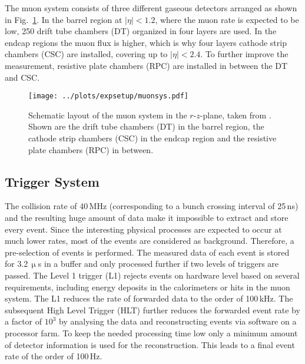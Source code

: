 \noindent The muon system consists of three different gaseous detectors arranged as shown in Fig.~\ref{fig:expsetup:muonsys}. In the barrel region at $|\eta|<1.2$, where the muon rate is expected to be low, 250 drift tube chambers (DT) organized in four layers are used. In the endcap regions the muon flux is higher, which is why four layers cathode strip chambers (CSC) are installed, covering up to $|\eta|<2.4$. To further improve the measurement, resistive plate chambers (RPC) are installed in between the DT and CSC.
\begin{figure}
    \centering
    \texttt{[image: ../plots/expsetup/muonsys.pdf]}
    \caption[Schematic layout of the muon system in the $r$-$z$-plane]{Schematic layout of the muon system in the $r$-$z$-plane, taken from \cite{CMS_design}. Shown are the drift tube chambers (DT) in the barrel region, the cathode strip chambers (CSC) in the endcap region and the resistive plate chambers (RPC) in between.}
    \label{fig:expsetup:muonsys}
\end{figure}
\subsection*{Trigger System}
The collision rate of 40\,MHz (corresponding to a bunch crossing interval of 25\,ns) and the resulting huge amount of data make it impossible to extract and store every event. Since the interesting physical processes are expected to occur at much lower rates, most of the events are considered as background. Therefore, a pre-selection of events is performed. The measured data of each event is stored for 3.2\,$\upmu$s in a buffer and only processed further if two levels of triggers are passed. The Level 1 trigger (L1) \cite{triggerL1} rejects events on hardware level based on several requirements, including energy deposits in the calorimeters or hits in the muon system. The L1 reduces the rate of forwarded data to the order of 100\,kHz. The subsequent High Level Trigger (HLT) \cite{HLT} further reduces the forwarded event rate by a factor of $10^3$ by analysing the data and reconstructing events via software on a processor farm. To keep the needed processing time low only a minimum amount of detector information is used for the reconstruction. This leads to a final event rate of the order of 100\,Hz.
